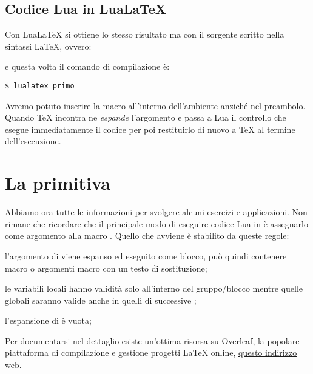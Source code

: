 \subsection{Codice Lua in Lua\LaTeX}
\label{iSecLuaInLuaLaTeX}

Con Lua\LaTeX{} si ottiene lo stesso risultato ma con il sorgente scritto nella
sintassi \LaTeX, ovvero:
e questa volta il comando di compilazione è:
\begin{Verbatim}[numbers=none]
$ lualatex primo
\end{Verbatim}

Avremo potuto inserire la macro all'interno dell'ambiente  anziché
nel preambolo. Quando \TeX{} incontra  ne \emph{espande}
l'argomento e passa a Lua il controllo che esegue immediatamente il codice per
poi restituirlo di nuovo a \TeX{} al termine dell'esecuzione.


\section{La primitiva }
\label{iSecDirectLua}

Abbiamo ora tutte le informazioni per svolgere alcuni esercizi e applicazioni.
Non rimane che ricordare che il principale modo di eseguire codice Lua in
\LuaTeX{} è assegnarlo come argomento alla macro . Quello che
avviene è stabilito da queste regole:
\begin{compactenumerate}
\item l'argomento di  viene espanso ed eseguito come blocco, può
quindi contenere macro o argomenti macro con un testo di sostituzione;

\item le variabili locali hanno validità solo all'interno del gruppo/blocco
mentre quelle globali saranno valide anche in quelli di successive
;

\item l'espansione di  è vuota;
\end{compactenumerate}

Per documentarsi nel dettaglio esiste un'ottima risorsa su Overleaf, la popolare
piattaforma di compilazione e gestione progetti \LaTeX{} online,
\href{https://cs.overleaf.com/learn/latex/Articles/An_Introduction_to_LuaTeX_(Part_2):_Understanding_%5Cdirectlua}{questo indirizzo web}.


